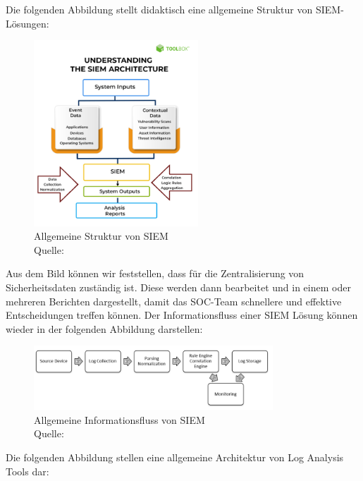 Die folgenden Abbildung stellt didaktisch eine allgemeine Struktur von \gls{SIEM}-Lösungen: 

\begin{figure}[H]
   \centering
   \includegraphics[width=0.55\textwidth]{assets/2_p1.png}
   \caption{Allgemeine Struktur von \gls{SIEM} \\Quelle: \citep{Mohanan_What} }
   \label{fig:SIEM_Allg_Struktur}
   \centering
\end{figure}

\newpage
Aus dem Bild können wir feststellen, dass  für die Zentralisierung von Sicherheitsdaten zuständig ist. Diese werden dann bearbeitet und in einem oder mehreren Berichten dargestellt, damit das \gls{SOC}-Team schnellere und effektive Entscheidungen treffen können. Der Informationsfluss einer \gls{SIEM} Lösung können wieder in der folgenden Abbildung darstellen:

\begin{figure}[H]
   \centering
   \includegraphics[width=0.8\textwidth]{assets/2_p2.png}
   \caption{Allgemeine Informationsfluss von \gls{SIEM} \\Quelle: \citep{Granadillo_SIEM} }
   \label{fig:SIEM_Allg_Informationsfluss}
   \centering
\end{figure}

Die folgenden Abbildung stellen eine allgemeine Architektur von Log Analysis Tools dar:

